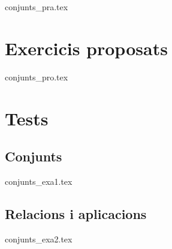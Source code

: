 \documentclass[a4paper,12pt]{book}
\begin{document}
{conjunts_pra.tex}

\chapter{Exercicis proposats}

{conjunts_pro.tex}

\chapter{Tests}

\section{Conjunts}

{conjunts_exa1.tex}

\section{Relacions i aplicacions}

{conjunts_exa2.tex}

\backmatter
\end{document}
